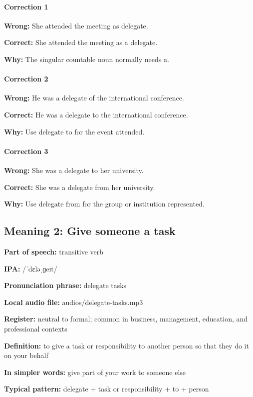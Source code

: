 \documentclass[11pt]{article}
\begin{document}
\paragraph{Correction 1}
\textbf{Wrong:} She attended the meeting as delegate.

\textbf{Correct:} She attended the meeting as a delegate.

\textbf{Why:} The singular countable noun normally needs a.

\paragraph{Correction 2}
\textbf{Wrong:} He was a delegate of the international conference.

\textbf{Correct:} He was a delegate to the international conference.

\textbf{Why:} Use delegate to for the event attended.

\paragraph{Correction 3}
\textbf{Wrong:} She was a delegate to her university.

\textbf{Correct:} She was a delegate from her university.

\textbf{Why:} Use delegate from for the group or institution represented.

\subsection{Meaning 2: Give someone a task}
\textbf{Part of speech:} transitive verb

\textbf{IPA:} /ˈdɛləˌɡeɪt/

\textbf{Pronunciation phrase:} delegate tasks

\textbf{Local audio file:} audios/delegate-tasks.mp3

\textbf{Register:} neutral to formal; common in business, management, education, and professional contexts

\textbf{Definition:} to give a task or responsibility to another person so that they do it on your behalf

\textbf{In simpler words:} give part of your work to someone else

\textbf{Typical pattern:} delegate + task or responsibility + to + person
\end{document}
